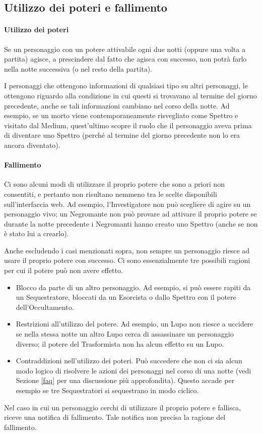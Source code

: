 \documentclass[a4paper,10pt]{article}
\begin{document}
\subsection{Utilizzo dei poteri e fallimento}
\label{fallimento}

\paragraph{Utilizzo dei poteri} 
Se un personaggio con un potere attivabile ogni due notti (oppure una volta a partita) agisce, a prescindere dal fatto che agisca con successo, non potrà farlo nella notte successiva (o nel resto della partita).

I personaggi che ottengono informazioni di qualsiasi tipo su altri personaggi, le ottengono riguardo alla condizione in cui questi si trovavano al termine del giorno precedente, anche se tali informazioni cambiano nel corso della notte.
Ad esempio, se un morto viene contemporaneamente risvegliato come Spettro e visitato dal Medium, quest'ultimo scopre il ruolo che il personaggio aveva prima di diventare uno Spettro (perché al termine del giorno precedente non lo era ancora diventato).


\paragraph{Fallimento} Ci sono alcuni modi di utilizzare il proprio potere che sono a priori non consentiti, e pertanto non risultano nemmeno tra le scelte disponibili sull'interfaccia web. Ad esempio, l'Investigatore non può scegliere di agire su un personaggio vivo; un Negromante non può provare ad attivare il proprio potere se durante la notte precedente i Negromanti hanno creato uno Spettro (anche se non è stato lui a crearlo).

Anche escludendo i casi menzionati sopra, non sempre un personaggio riesce ad usare il proprio potere con successo. Ci sono essenzialmente tre possibili ragioni per cui il potere può non avere effetto.
\begin{itemize}
 \item Blocco da parte di un altro personaggio. Ad esempio, si può essere rapiti da un Sequestratore, bloccati da un Esorcista o dallo Spettro con il potere dell'Occultamento.
 \item Restrizioni all'utilizzo del potere. Ad esempio, un Lupo non riesce a uccidere se nella stessa notte un altro Lupo cerca di assassinare un personaggio diverso; il potere del Trasformista non ha alcun effetto su un Lupo.
 \item Contraddizioni nell'utilizzo dei poteri. Può succedere che non ci sia alcun modo logico di risolvere le azioni dei personaggi nel corso di una notte (vedi Sezione \ref{faq} per una discussione più approfondita). Questo accade per esempio se tre Sequestratori si sequestrano in modo ciclico.
\end{itemize}
Nel caso in cui un personaggio cerchi di utilizzare il proprio potere e fallisca, riceve una notifica di fallimento. Tale notifica non precisa la ragione del fallimento.
\end{document}

